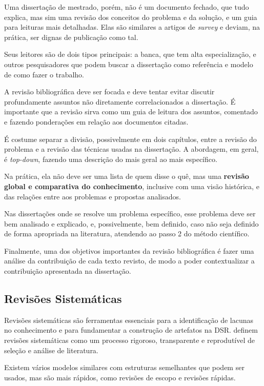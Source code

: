 Uma dissertação de mestrado, porém, não é um documento fechado, que tudo explica, mas sim uma revisão dos conceitos do problema e da solução, e um guia para leituras mais detalhadas. 
Elas são similares a artigos de \textit{survey} e deviam, na prática, ser dignas de publicação como tal.

Seus leitores são de dois tipos principais: a banca, que tem alta especialização, e outros pesquisadores que podem buscar a dissertação como referência e modelo de como fazer o trabalho.

A revisão bibliográfica deve ser focada e deve tentar evitar discutir profundamente assuntos não diretamente correlacionados a dissertação.
É importante que a revisão sirva como um guia de leitura dos assuntos, comentado e fazendo ponderações em relação aos documentos citadas.

É costume separar a divisão, possivelmente em dois capítulos, entre a revisão do problema e a revisão das técnicas usadas na dissertação. A abordagem, em geral, é \textit{top-down}, fazendo uma descrição do mais geral ao mais específico.

Na prática, ela não deve ser uma lista de quem disse o quê, mas uma \textbf{revisão global e comparativa do conhecimento}, inclusive com uma visão histórica, e das relações entre aos problemas e propostas analisados.

Nas dissertações onde se resolve um problema específico, esse problema deve ser bem analisado e explicado, e, possivelmente, bem definido, caso não seja definido de forma apropriada na literatura, atendendo ao passo 2 do método científico. 

Finalmente, uma dos objetivos importantes da revisão bibliográfica é fazer uma análise da contribuição de cada texto revisto, de modo a poder contextualizar a contribuição apresentada na dissertação.


\subsection{Revisões Sistemáticas}

Revisões sistemáticas são ferramentas essenciais para a identificação de lacunas no conhecimento e para fundamentar a construção de artefatos na DSR.  \citet{kitchenham2004procedures} definem revisões sistemáticas como um processo rigoroso, transparente e reprodutível de seleção e análise de literatura.

Existem vários modelos similares com estruturas semelhantes que podem ser usados, mas são mais rápidos, como revisões de escopo e revisões rápidas.

